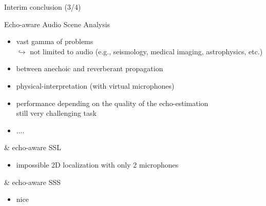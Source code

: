 \begin{frame}{Interim conclusion (3/4)}
    \begin{block}{Echo-aware Audio Scene Analysis}
        \begin{itemize}
            \item[\cmark] vast gamma of problems
            \\$\hookrightarrow$ not limited to audio (e.g., seismology, medical imaging, astrophysics, etc.)
            \item[\cmark] between anechoic and reverberant propagation
            \item[\cmark] physical-interpretation (with virtual microphones)
            \item[\xmark] performance depending on the quality of the echo-estimation
            \\still very challenging task
            \item[\xmark] ....
        \end{itemize}
    \end{block}

    \vfill

    \begin{block}{\mirage \& echo-aware SSL}
        \begin{itemize}
            \item[\cmark] impossible 2D localization with only 2 microphones
        \end{itemize}
    \end{block}

    \vfill

    \begin{block}{\separake \& echo-aware SSS}
        \begin{itemize}
            \item nice
        \end{itemize}
    \end{block}
\end{frame}